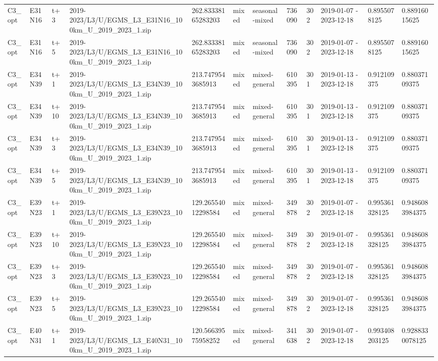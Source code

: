 \begin{landscape}
\begin{longtable}{llllllllllll}
C3\_opt & E31N16 & t+3 & 2019-2023/L3/U/EGMS\_L3\_E31N16\_100km\_U\_2019\_2023\_1.zip & 262.83338165283203 & mixed & seasonal-mixed & 736090 & 302 & 2019-01-07 - 2023-12-18 & 0.8955078125 & 0.88916015625 \\
C3\_opt & E31N16 & t+5 & 2019-2023/L3/U/EGMS\_L3\_E31N16\_100km\_U\_2019\_2023\_1.zip & 262.83338165283203 & mixed & seasonal-mixed & 736090 & 302 & 2019-01-07 - 2023-12-18 & 0.8955078125 & 0.88916015625 \\
C3\_opt & E34N39 & t+1 & 2019-2023/L3/U/EGMS\_L3\_E34N39\_100km\_U\_2019\_2023\_1.zip & 213.7479543685913 & mixed & mixed-general & 610395 & 301 & 2019-01-13 - 2023-12-18 & 0.912109375 & 0.88037109375 \\
C3\_opt & E34N39 & t+10 & 2019-2023/L3/U/EGMS\_L3\_E34N39\_100km\_U\_2019\_2023\_1.zip & 213.7479543685913 & mixed & mixed-general & 610395 & 301 & 2019-01-13 - 2023-12-18 & 0.912109375 & 0.88037109375 \\
C3\_opt & E34N39 & t+3 & 2019-2023/L3/U/EGMS\_L3\_E34N39\_100km\_U\_2019\_2023\_1.zip & 213.7479543685913 & mixed & mixed-general & 610395 & 301 & 2019-01-13 - 2023-12-18 & 0.912109375 & 0.88037109375 \\
C3\_opt & E34N39 & t+5 & 2019-2023/L3/U/EGMS\_L3\_E34N39\_100km\_U\_2019\_2023\_1.zip & 213.7479543685913 & mixed & mixed-general & 610395 & 301 & 2019-01-13 - 2023-12-18 & 0.912109375 & 0.88037109375 \\
C3\_opt & E39N23 & t+1 & 2019-2023/L3/U/EGMS\_L3\_E39N23\_100km\_U\_2019\_2023\_1.zip & 129.26554012298584 & mixed & mixed-general & 349878 & 302 & 2019-01-07 - 2023-12-18 & 0.995361328125 & 0.9486083984375 \\
C3\_opt & E39N23 & t+10 & 2019-2023/L3/U/EGMS\_L3\_E39N23\_100km\_U\_2019\_2023\_1.zip & 129.26554012298584 & mixed & mixed-general & 349878 & 302 & 2019-01-07 - 2023-12-18 & 0.995361328125 & 0.9486083984375 \\
C3\_opt & E39N23 & t+3 & 2019-2023/L3/U/EGMS\_L3\_E39N23\_100km\_U\_2019\_2023\_1.zip & 129.26554012298584 & mixed & mixed-general & 349878 & 302 & 2019-01-07 - 2023-12-18 & 0.995361328125 & 0.9486083984375 \\
C3\_opt & E39N23 & t+5 & 2019-2023/L3/U/EGMS\_L3\_E39N23\_100km\_U\_2019\_2023\_1.zip & 129.26554012298584 & mixed & mixed-general & 349878 & 302 & 2019-01-07 - 2023-12-18 & 0.995361328125 & 0.9486083984375 \\
C3\_opt & E40N31 & t+1 & 2019-2023/L3/U/EGMS\_L3\_E40N31\_100km\_U\_2019\_2023\_1.zip & 120.56639575958252 & mixed & mixed-general & 341638 & 302 & 2019-01-07 - 2023-12-18 & 0.993408203125 & 0.9288330078125 \\

\end{longtable}
\end{landscape}
